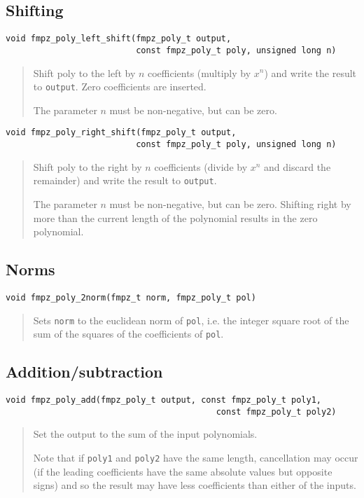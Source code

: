 \documentclass[a4paper,10pt]{article}
\newcommand{\code}{\lstinline}
\begin{document}
\subsection{Shifting}

\begin{lstlisting}
void fmpz_poly_left_shift(fmpz_poly_t output, 
                          const fmpz_poly_t poly, unsigned long n) 
\end{lstlisting}
\begin{quote}
Shift poly to the left by $n$ coefficients (multiply by $x^n$) and write the result to \code{output}. Zero coefficients are inserted.

The parameter $n$ must be non-negative, but can be zero.
\end{quote}

\begin{lstlisting}
void fmpz_poly_right_shift(fmpz_poly_t output, 
                          const fmpz_poly_t poly, unsigned long n) 
\end{lstlisting}
\begin{quote}
Shift poly to the right by $n$ coefficients (divide by $x^n$ and discard the remainder) and write the result to \code{output}. 

The parameter $n$ must be non-negative, but can be zero. Shifting right by more than the current length of the polynomial results in the zero polynomial.
\end{quote}


\subsection{Norms}

\begin{lstlisting}
void fmpz_poly_2norm(fmpz_t norm, fmpz_poly_t pol)
\end{lstlisting}
\begin{quote}
Sets \code{norm} to the euclidean norm of \code{pol}, i.e. the integer square root of the sum of the squares of the coefficients of \code{pol}.
\end{quote}


\subsection{Addition/subtraction}


\begin{lstlisting}
void fmpz_poly_add(fmpz_poly_t output, const fmpz_poly_t poly1, 
                                          const fmpz_poly_t poly2) 
\end{lstlisting}
\begin{quote}
Set the output to the sum of the input polynomials. 

Note that if \code{poly1} and \code{poly2} have the same length, cancellation may occur (if the leading coefficients have the same absolute values but opposite signs) and so the result may have less coefficients than either of the inputs. 
\end{quote}
\end{document}
